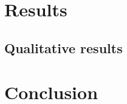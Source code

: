 \documentclass[10pt,a4paper,notitlepage,twocolumn]{report}
\begin{document}
\section{Results}

\subsection{Qualitative results}
\section{Conclusion}



\end{document}
